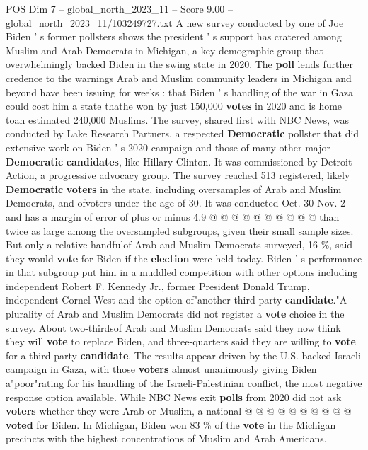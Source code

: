 \begin{textsample}{POS Dim 7 – global\_north\_2023\_11 – Score 9.00 – global\_north\_2023\_11/103249727.txt}  \label{ex:f7_pos_134}
A new survey conducted by one of Joe Biden ' s former pollsters shows the president ' s support has cratered among Muslim and Arab Democrats in Michigan, a key demographic group that overwhelmingly backed Biden in the swing state in 2020.
The \textbf{poll} lends further credence to the warnings Arab and Muslim community leaders in Michigan and beyond have been issuing for weeks : that Biden ' s handling of the war in Gaza could cost him a state thathe won by just 150,000 \textbf{votes} in 2020 and is home toan estimated 240,000 Muslims.
The survey, shared first with NBC News, was conducted by Lake Research Partners, a respected \textbf{Democratic} pollster that did extensive work on Biden ' s 2020 campaign and those of many other major \textbf{Democratic} \textbf{candidates}, like Hillary Clinton.
It was commissioned by Detroit Action, a progressive advocacy group.
The survey reached 513 registered, likely \textbf{Democratic} \textbf{voters} in the state, including oversamples of Arab and Muslim Democrats, and ofvoters under the age of 30.
It was conducted Oct. 30-Nov. 2 and has a margin of error of plus or minus 4.9 @ @ @ @ @ @ @ @ @ @ than twice as large among the oversampled subgroups, given their small sample sizes.
But only a relative handfulof Arab and Muslim Democrats surveyed, 16 \%, said they would \textbf{vote} for Biden if the \textbf{election} were held today.
Biden ' s performance in that subgroup put him in a muddled competition with other options including independent Robert F.
Kennedy Jr., former President Donald Trump, independent Cornel West and the option of"another third-party \textbf{candidate}."A plurality of Arab and Muslim Democrats did not register a \textbf{vote} choice in the survey.
About two-thirdsof Arab and Muslim Democrats said they now think they will \textbf{vote} to replace Biden, and three-quarters said they are willing to \textbf{vote} for a third-party \textbf{candidate}.
The results appear driven by the U.S.-backed Israeli campaign in Gaza, with those \textbf{voters} almost unanimously giving Biden a"poor"rating for his handling of the Israeli-Palestinian conflict, the most negative response option available.
While NBC News exit \textbf{polls} from 2020 did not ask \textbf{voters} whether they were Arab or Muslim, a national @ @ @ @ @ @ @ @ @ @ \textbf{voted} for Biden.
In Michigan, Biden won 83 \% of the \textbf{vote} in the Michigan precincts with the highest concentrations of Muslim and Arab Americans.

\end{textsample}
